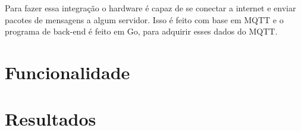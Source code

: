 Para fazer essa integração o hardware é capaz de se conectar a internet e enviar pacotes de mensagens a algum servidor. Isso é feito com base em MQTT e o programa de back-end é feito em Go, para adquirir esses dados do MQTT.



\section{Funcionalidade}
\section{Resultados}
